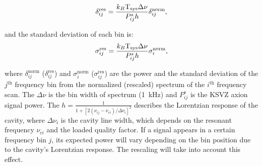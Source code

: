 \begin{equation}
  \label{eq:respower_eqn}
  \delta_{ij}^\text{res} = \frac{k_{B}\text{T}_\text{sys} \Delta\nu }{P_{ij}^{s} h}\delta_{ij}^\text{norm},
\end{equation}

and the standard deviation of each bin is:
\begin{equation}
  \label{eq:ressigma_eqn}
  \sigma_{ij}^\text{res} = \frac{k_{B}\text{T}_\text{sys}\Delta\nu }{P_{ij}^{s} h}\sigma_{i}^\text{norm},
\end{equation}

where $\delta_{ij}^\text{norm}$ ($\delta_{ij}^\text{res}$) and 
$\sigma_{i}^\text{norm}$ ($\sigma_{ij}^\text{res}$) are the power and the 
standard deviation of the $j^\text{th}$ frequency bin from the 
normalized (rescaled) spectrum of the $i^\text{th}$ frequency scan. 
The $\Delta\nu$ is the bin 
width of spectrum (1~kHz) and  $P_{ij}^{s}$ is the KSVZ axion signal power. 
The $h = \frac{1}{1 + [2(\nu_{ij} - \nu_{ci})/\Delta\nu_{i}]^2}$ 
describes the Lorentzian response of the cavity, where 
$\Delta\nu_{i}$ is the cavity line width, which depends on the resonant 
frequency $\nu_{ci}$ and the loaded quality factor. 
%
If a signal appears in a certain frequency bin $j$, its expected power 
will vary depending on the bin position due to the cavity's 
Lorentzian response. The rescaling will take into account this effect.

